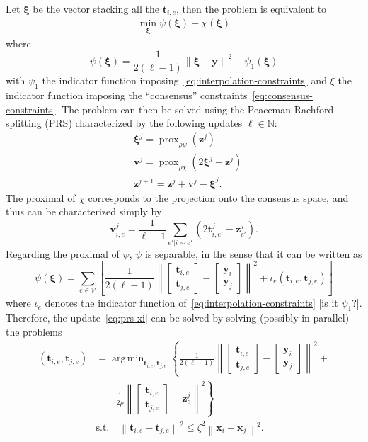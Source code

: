 \documentclass{article}
\DeclareMathOperator*{\argmin}{arg\,min}
\DeclareMathOperator{\prox}{prox}
\newcommand{\norm}[1]{\left\lVert#1\right\rVert}
\newcommand{\tv}{\mathbold{t}}
\newcommand{\x}{\mathbold{x}}
\newcommand{\y}{\mathbold{y}}
\newcommand{\vv}{\mathbold{v}}
\newcommand{\z}{\mathbold{z}}
\newcommand{\xx}{\pmb{\xi}}
\newcommand{\andrea}[1]{{\color{red}[#1]}}
\begin{document}
Let $\xx$ be the vector stacking all the $\tv_{i,e}$, then the problem is equivalent to
\begin{align*}
	\min_{\xx} \psi(\xx) + \chi(\xx)
\end{align*}
where
$$
	\psi(\xx) = \frac{1}{2(\ell-1)} \norm{\xx - \y}^2 + \psi_1(\xx)
$$
with $\psi_1$ the indicator function imposing~\eqref{eq:interpolation-constraints} and $\xi$ the indicator function imposing the ``consensus'' constraints~\eqref{eq:consensus-constraints}. The problem can then be solved using the Peaceman-Rachford splitting (PRS) characterized by the following updates $\ell \in \mathbb{N}$:
\begin{subequations}
\begin{align}
	&\xx^j = \prox_{\rho \psi}(\z^j) \label{eq:prs-xi} \\
	&\vv^j = \prox_{\rho \chi}(2 \xx^j - \z^j) \\
	&\z^{j+1} = \z^j + \vv^j - \xx^j.
\end{align}
\end{subequations}
The proximal of $\chi$ corresponds to the projection onto the consensus space, and thus can be characterized simply by
$$
	\vv_{i,e}^j = \frac{1}{\ell-1} \sum_{e' | i \sim e'} \left( 2 \tv_{i,e'}^j - \z_{e'}^j\right).
$$
Regarding the proximal of $\psi$, $\psi$ is separable, in the sense that it can be written as
$$
	\psi(\xx) = \sum_{e \in \mathcal{V}} \left[ \frac{1}{2 (\ell-1)} \norm{\begin{bmatrix} \tv_{i,e} \\ \tv_{j,e} \end{bmatrix} - \begin{bmatrix} \y_i \\ \y_j \end{bmatrix}}^2 + \iota_{e}(\tv_{i,e},\tv_{j,e}) \right]
$$
where $\iota_{e}$ denotes the indicator function of~\eqref{eq:interpolation-constraints} \andrea{is it $\psi_1$?}. Therefore, the update~\eqref{eq:prs-xi} can be solved by solving (possibly in parallel) the problems
\begin{equation}\label{eq:local-updates}
\begin{split}
	(\tv_{i,e},\tv_{j,e}) &= \argmin_{\tv_{i,e},\tv_{j,e}} \left\{ \frac{1}{2 (\ell-1)} \norm{\begin{bmatrix} \tv_{i,e} \\ \tv_{j,e} \end{bmatrix} - \begin{bmatrix} \y_i \\ \y_j \end{bmatrix}}^2 + \right.\\ & \left.\qquad \frac{1}{2\rho} \norm{\begin{bmatrix} \tv_{i,e} \\ \tv_{j,e} \end{bmatrix} - \z_e^j}^2 \right\}\\
	&\text{s.t.} \quad \norm{\tv_{i,e} - \tv_{j,e}}^2 \leq \zeta^2 \norm{\x_i - \x_j}^2.
\end{split}
\end{equation}
\end{document}
